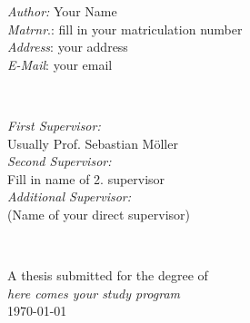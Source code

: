 \begin{titlepage}
\begin{minipage}{0.5\textwidth}
\begin{flushleft} \large
\emph{Author:} Your Name\\
\emph{Matrnr}.: fill in your matriculation number\\
\emph{Address}: your address \\
\emph{E-Mail}: your email\\
\end{flushleft}
\end{minipage}
~
\begin{minipage}{0.43\textwidth}
\begin{flushright} \large
\emph{First Supervisor:} \\
Usually Prof. Sebastian Möller\\
\emph{Second Supervisor:} \\
Fill in name of 2. supervisor\\
\emph{Additional Supervisor:}\\
(Name of your direct supervisor)
\end{flushright}
\end{minipage}\\[3cm]
\makeatother


{\large A thesis submitted for the degree of}\\[0.5cm]
{\large \emph{here comes your study program}}\\[0.5cm]
{\large \today}\\[2cm] %

\vfill %
 



\end{titlepage}
